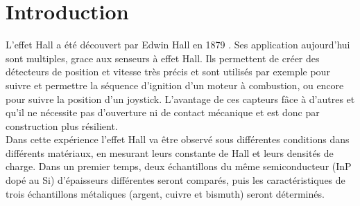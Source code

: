 \section{Introduction}

L'effet Hall a été découvert par Edwin Hall en 1879 \cite{hall}. Ses application aujourd'hui sont multiples, grace aux senseurs à effet Hall. Ils permettent de créer des détecteurs de position et vitesse très précis et sont utilisés par exemple pour suivre et permettre la séquence d'ignition d'un moteur à combustion, ou encore pour suivre la position d'un joystick. L'avantage de ces capteurs fâce à d'autres et qu'il ne nécessite pas d'ouverture ni de contact mécanique et est donc par construction plus résilient. \cite{hall_applications}\\
Dans cette expérience l'effet Hall va être observé sous différentes conditions dans différents matériaux, en mesurant leurs constante de Hall et leurs densités de charge. Dans un premier temps, deux échantillons du même semiconducteur (InP dopé au Si) d'épaisseurs différentes seront comparés, puis les caractéristiques de trois échantillons métaliques (argent, cuivre et bismuth) seront déterminés.

